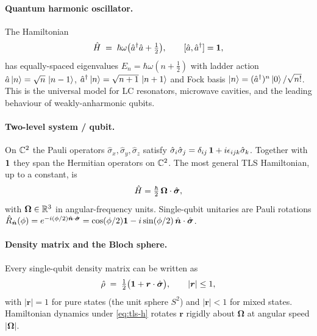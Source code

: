 \clearpage
\begin{chaptersummary}

\paragraph{Quantum harmonic oscillator.}
The Hamiltonian
\begin{equation}
\hat{H} \;=\; \hbar\omega\bigl(\hat{a}^\dagger\hat{a}+\tfrac12\bigr),
\qquad
[\hat{a},\hat{a}^\dagger]=\mathbf{1},
\end{equation}
has equally-spaced eigenvalues $E_n=\hbar\omega(n+\tfrac12)$ with
ladder action $\hat{a}\ket{n}=\sqrt{n}\,\ket{n-1}$,
$\hat{a}^\dagger\ket{n}=\sqrt{n+1}\,\ket{n+1}$ and Fock basis
$\ket{n}=(\hat{a}^\dagger)^n\ket{0}/\sqrt{n!}$. This is the
universal model for LC resonators, microwave cavities, and the
leading behaviour of weakly-anharmonic qubits.

\paragraph{Two-level system / qubit.}
On $\mathbb{C}^2$ the Pauli operators $\hat\sigma_x,\hat\sigma_y,\hat\sigma_z$
satisfy
$\hat\sigma_i\hat\sigma_j=\delta_{ij}\,\mathbf{1}+i\epsilon_{ijk}\hat\sigma_k$.
Together with $\mathbf{1}$ they span the Hermitian operators on $\mathbb{C}^2$.
The most general TLS Hamiltonian, up to a constant, is
\begin{equation}
\hat{H} = \tfrac{\hbar}{2}\,\bm{\Omega}\cdot\hat{\bm{\sigma}},
\end{equation}
with $\bm{\Omega}\in\mathbb{R}^3$ in angular-frequency units. Single-qubit
unitaries are Pauli rotations
$\hat{R}_{\hat{\bm{n}}}(\phi)=e^{-i(\phi/2)\hat{\bm{n}}\cdot\hat{\bm{\sigma}}}
=\cos(\phi/2)\mathbf{1}-i\sin(\phi/2)\,\hat{\bm{n}}\cdot\hat{\bm{\sigma}}$.

\paragraph{Density matrix and the Bloch sphere.}
Every single-qubit density matrix can be written as
\begin{equation}
\hat{\rho} \;=\; \tfrac12\bigl(\mathbf{1}+\bm{r}\cdot\hat{\bm{\sigma}}\bigr),
\qquad |\bm{r}|\leq 1,
\end{equation}
with $|\bm{r}|=1$ for pure states (the unit sphere $S^2$) and
$|\bm{r}|<1$ for mixed states. Hamiltonian dynamics under
\cref{eq:tls-h} rotates $\bm{r}$ rigidly about $\bm{\Omega}$ at
angular speed $|\bm{\Omega}|$.


\end{chaptersummary}
